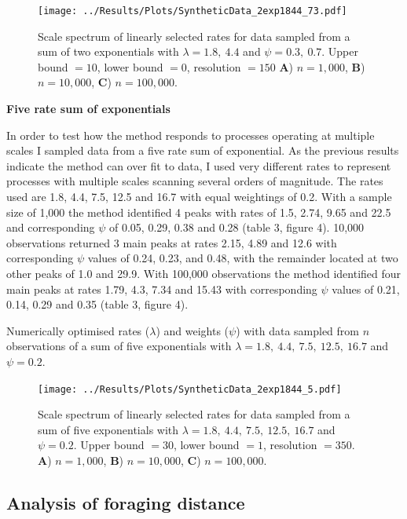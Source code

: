 \documentclass[11pt,usenames,dvipsnames,a4paper]{article}
\begin{document}
\begin{figure}[H]
	\centering
	\texttt{[image: ../Results/Plots/SyntheticData\_2exp1844\_73.pdf]}
	\caption{Scale spectrum of linearly selected rates for data sampled from a sum of two exponentials with $\lambda = 1.8,\ 4.4$ and $\psi = 0.3,\ 0.7$. Upper bound $= 10$, lower bound $= 0$, resolution $= 150$ \textbf{A}) $n = 1,000$, \textbf{B}) $n = 10,000$,  \textbf{C}) $n = 100,000$.}
\end{figure}

\noindent
\textbf{Five rate sum of exponentials}
\begin{linenumbers}

In order to test how the method responds to processes operating at multiple scales I sampled data from a five rate sum of exponential. As the previous results indicate the method can over fit to data, I used very different rates to represent processes with multiple scales scanning several orders of magnitude. The rates used are 1.8, 4.4, 7.5, 12.5 and 16.7 with equal weightings of 0.2. With a sample size of 1,000 the method identified 4 peaks with rates of 1.5, 2.74, 9.65 and 22.5 and corresponding $\psi$ of 0.05, 0.29, 0.38 and 0.28 (table 3, figure 4). 10,000 observations returned 3 main peaks at rates 2.15, 4.89 and 12.6 with corresponding $\psi$ values of 0.24, 0.23, and 0.48, with the remainder located at two other peaks of 1.0 and 29.9. With 100,000 observations the method identified four main peaks at rates 1.79, 4.3, 7.34 and 15.43 with corresponding $\psi$ values of 0.21, 0.14, 0.29 and 0.35 (table 3, figure 4). 
\end{linenumbers}
\begin{table}[H]
	\centering
	\caption{Numerically optimised rates ($\lambda$) and weights ($\psi$) with data sampled from $n$ observations of a sum of five exponentials with $\lambda = 1.8,\ 4.4,\ 7.5,\ 12.5,\ 16.7$ and $\psi = 0.2$.}
	
\end{table}
\begin{figure}[H]
	\centering
	\texttt{[image: ../Results/Plots/SyntheticData\_2exp1844\_5.pdf]}
	\caption{Scale spectrum of linearly selected rates for data sampled from a sum of five exponentials with $\lambda = 1.8,\ 4.4,\ 7.5,\ 12.5,\ 16.7$ and $\psi = 0.2$. Upper bound $= 30$, lower bound $= 1$, resolution $= 350$. \textbf{A}) $n = 1,000$, \textbf{B}) $n = 10,000$,  \textbf{C}) $n = 100,000$.}
\end{figure}

\subsection{Analysis of foraging distance}
\end{document}
